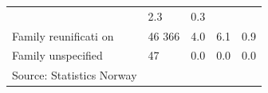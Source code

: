 \documentclass[
]{article}
\begin{document}
\begin{longtable}[]{@{}lllll@{}}
\begin{minipage}[t]{0.17\columnwidth}
\end{minipage} & \begin{minipage}[t]{0.17\columnwidth}\raggedright
2.3\strut
\end{minipage} & \begin{minipage}[t]{0.17\columnwidth}\raggedright
0.3\strut
\end{minipage}\tabularnewline
\begin{minipage}[t]{0.17\columnwidth}\raggedright
Family
reunificati
on\strut
\end{minipage} & \begin{minipage}[t]{0.17\columnwidth}\raggedright
46 366\strut
\end{minipage} & \begin{minipage}[t]{0.17\columnwidth}\raggedright
4.0\strut
\end{minipage} & \begin{minipage}[t]{0.17\columnwidth}\raggedright
6.1\strut
\end{minipage} & \begin{minipage}[t]{0.17\columnwidth}\raggedright
0.9\strut
\end{minipage}\tabularnewline
\begin{minipage}[t]{0.17\columnwidth}\raggedright
Family
unspecified\strut
\end{minipage} & \begin{minipage}[t]{0.17\columnwidth}\raggedright
47\strut
\end{minipage} & \begin{minipage}[t]{0.17\columnwidth}\raggedright
0.0\strut
\end{minipage} & \begin{minipage}[t]{0.17\columnwidth}\raggedright
0.0\strut
\end{minipage} & \begin{minipage}[t]{0.17\columnwidth}\raggedright
0.0\strut
\end{minipage}\tabularnewline
\begin{minipage}[t]{0.17\columnwidth}\raggedright
Source:
Statistics
Norway\strut
\end{minipage} & \begin{minipage}[t]{0.17\columnwidth}\raggedright
\strut
\end{minipage} & \begin{minipage}[t]{0.17\columnwidth}\raggedright
\strut
\end{minipage} & \begin{minipage}[t]{0.17\columnwidth}\raggedright
\strut
\end{minipage} & \begin{minipage}[t]{0.17\columnwidth}\raggedright
\strut
\end{minipage}\tabularnewline
\bottomrule
\end{longtable}
\end{document}
